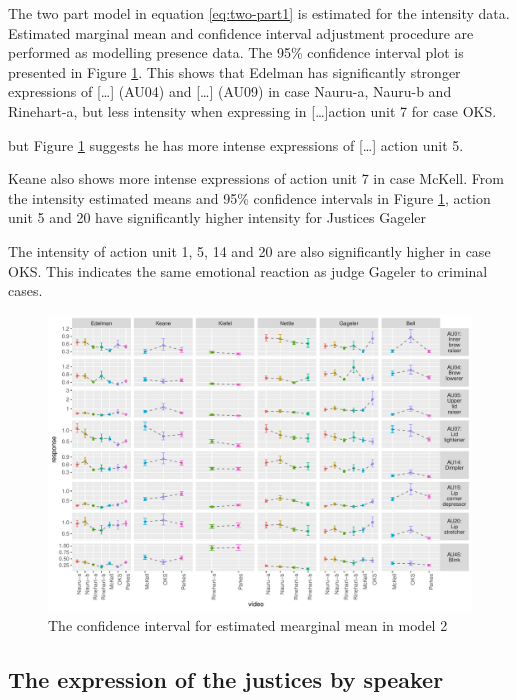 \documentclass{monashthesis}
\begin{document}
The two part model in equation \ref{eq:two-part1} is estimated for the intensity data. Estimated marginal mean and confidence interval adjustment procedure are performed as modelling presence data. The 95\% confidence interval plot is presented in Figure \ref{fig:intensity-video}. This shows that Edelman has significantly stronger expressions of {[}\ldots{}{]} (AU04) and {[}\ldots{}{]} (AU09) in case Nauru-a, Nauru-b and Rinehart-a, but less intensity when expressing in {[}\ldots{}{]}action unit 7 for case OKS.

but Figure \ref{fig:intensity-video} suggests he has more intense expressions of {[}\ldots{}{]} action unit 5.

Keane also shows more intense expressions of action unit 7 in case McKell.
From the intensity estimated means and 95\% confidence intervals in Figure \ref{fig:intensity-video}, action unit 5 and 20 have significantly higher intensity for Justices Gageler

The intensity of action unit 1, 5, 14 and 20 are also significantly higher in case OKS. This indicates the same emotional reaction as judge Gageler to criminal cases.

\begin{figure}

{\centering \includegraphics[width=1\linewidth]{figures/intensity-video-1} 

}

\caption{The confidence interval for estimated mearginal mean in model 2}\label{fig:intensity-video}
\end{figure}

\hypertarget{the-expression-of-the-justices-by-speaker}{%
\subsection{The expression of the justices by speaker}\label{the-expression-of-the-justices-by-speaker}}
\end{document}
